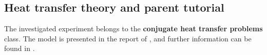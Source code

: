 \subsection{Heat transfer theory and parent tutorial}
\label{subsection:heattransfertheorytutorial}

The investigated experiment belongs to the \textbf{conjugate heat transfer
problems} class.
The model is presented in the report of \textcite{ReportTempel},
and further information can be found in \textcite{OFWikicht}.
